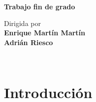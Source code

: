 \documentclass[11pt,a4paper]{article}
\begin{document}
\begin{frontmatter}
\vfill

\begin{center}
  {\Large \textbf{Trabajo fin de grado}}
\end{center}

\vfill

\begin{large}
\begin{center}
{Dirigida por}  \\ [0.3em]
\textbf{Enrique Martín Martín}\\[0.3em]
\textbf{Adrián Riesco}
\begin{large}
\begin{center}
\vspace{3ex}
\end{center}
\end{large}
\end{center}

\vfill

\end{large}

\newpage

\thispagestyle{empty}
\mbox{ }

\clearpage


%


\end{frontmatter}

%




\newpage

\clearpage
\thispagestyle{empty}
\tableofcontents



\newpage
\section{Introducci\'on\label{sec:intro}}

\end{document}
